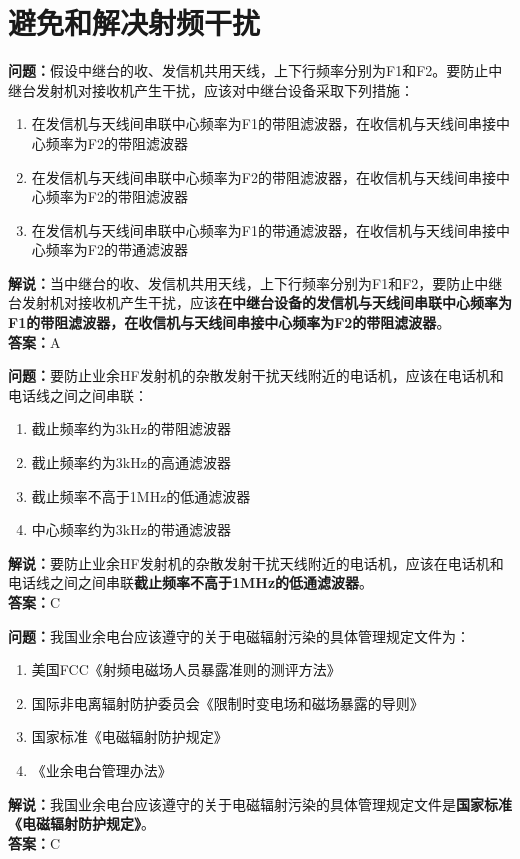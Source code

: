 \chapter{避免和解决射频干扰}




\noindent\textbf{问题：}假设中继台的收、发信机共用天线，上下行频率分别为F1和F2。要防止中继台发射机对接收机产生干扰，应该对中继台设备采取下列措施：
\begin{enumerate}[label=\Alph*), leftmargin=3em]
	\item 在发信机与天线间串联中心频率为F1的带阻滤波器，在收信机与天线间串接中心频率为F2的带阻滤波器
	\item 在发信机与天线间串联中心频率为F2的带阻滤波器，在收信机与天线间串接中心频率为F2的带阻滤波器
	\item 在发信机与天线间串联中心频率为F1的带通滤波器，在收信机与天线间串接中心频率为F2的带通滤波器
\end{enumerate}
\noindent\textbf{解说：}当中继台的收、发信机共用天线，上下行频率分别为F1和F2，要防止中继台发射机对接收机产生干扰，应该\textbf{在中继台设备的发信机与天线间串联中心频率为F1的带阻滤波器，在收信机与天线间串接中心频率为F2的带阻滤波器}。\\\noindent\textbf{答案：}A

\bigskip


\noindent\textbf{问题：}要防止业余HF发射机的杂散发射干扰天线附近的电话机，应该在电话机和电话线之间之间串联：
\begin{enumerate}[label=\Alph*), leftmargin=3em]	
	\item 截止频率约为3kHz的带阻滤波器
	\item 截止频率约为3kHz的高通滤波器
	\item 截止频率不高于1MHz的低通滤波器
	\item 中心频率约为3kHz的带通滤波器
\end{enumerate}
\noindent\textbf{解说：}要防止业余HF发射机的杂散发射干扰天线附近的电话机，应该在电话机和电话线之间之间串联\textbf{截止频率不高于1MHz的低通滤波器}。\\\noindent
\textbf{答案：}C

\bigskip


\noindent\textbf{问题：}我国业余电台应该遵守的关于电磁辐射污染的具体管理规定文件为：
\begin{enumerate}[label=\Alph*), leftmargin=3em]
	\item 美国FCC《射频电磁场人员暴露准则的测评方法》
	\item 国际非电离辐射防护委员会《限制时变电场和磁场暴露的导则》
	\item 国家标准《电磁辐射防护规定》
	\item 《业余电台管理办法》
\end{enumerate}
\noindent\textbf{解说：}我国业余电台应该遵守的关于电磁辐射污染的具体管理规定文件是\textbf{国家标准《电磁辐射防护规定》}。\\\textbf{答案：}C

